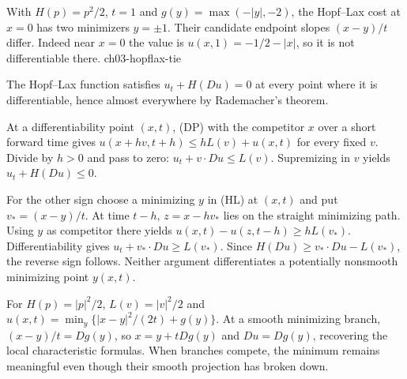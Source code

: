 {With $H(p)=p^2/2$, $t=1$ and $g(y)=\max(-|y|,-2)$, the Hopf--Lax cost at $x=0$ has two minimizers $y=\pm1$. Their candidate endpoint slopes $(x-y)/t$ differ. Indeed near $x=0$ the value is $u(x,1)=-1/2-|x|$, so it is not differentiable there.}
{ch03-hopflax-tie}

\begin{theorem}
The Hopf--Lax function satisfies $u_t+H(Du)=0$ at every point where
it is differentiable, hence almost everywhere by Rademacher's theorem.
\end{theorem}
\begin{expandedproof}
At a differentiability point $(x,t)$, (DP) with the competitor $x$
over a short forward time gives
$u(x+hv,t+h)\leq hL(v)+u(x,t)$ for every fixed $v$.
Divide by $h>0$ and pass to zero:
$u_t+v\cdot Du\leq L(v)$. Supremizing in $v$ yields
$u_t+H(Du)\leq0$.

For the other sign choose a minimizing $y$ in (HL) at $(x,t)$ and
put $v_*=(x-y)/t$.
At time $t-h$, $z=x-hv_*$ lies on the straight minimizing path.
Using $y$ as competitor there yields
$u(x,t)-u(z,t-h)\geq hL(v_*)$.
Differentiability gives $u_t+v_*\cdot Du\geq L(v_*)$.
Since $H(Du)\geq v_*\cdot Du-L(v_*)$, the reverse sign follows.
Neither argument differentiates a potentially nonsmooth minimizing
point $y(x,t)$.
\end{expandedproof}
\Needspace{45mm}

For $H(p)=|p|^2/2$, $L(v)=|v|^2/2$ and
$u(x,t)=\min_y\{|x-y|^2/(2t)+g(y)\}$.
At a smooth minimizing branch,
$(x-y)/t=Dg(y)$, so $x=y+tDg(y)$ and $Du=Dg(y)$,
recovering the local characteristic formulas.
When branches compete, the minimum remains meaningful even though
their smooth projection has broken down.


